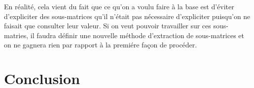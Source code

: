 \documentclass[a4paper,11pt]{article}
\begin{document}
En réalité, cela vient du fait que ce qu'on a voulu faire à la base est d'éviter d'expliciter des sous-matrices qu'il n'était pas nécessaire d'expliciter puisqu'on ne faisait que consulter leur valeur. Si on veut pouvoir travailler sur ces sous-matries, il faudra définir une nouvelle méthode d'extraction de sous-matrices et on ne gagnera rien par rapport à la premiére façon de procéder.

\section*{Conclusion}
\end{document}
